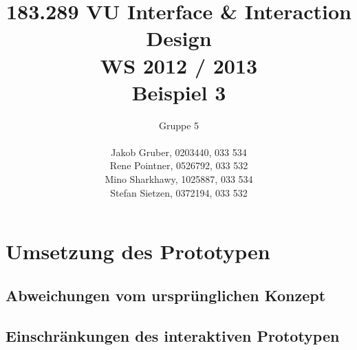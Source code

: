 \documentclass[a4paper,10pt]{article}
\title{
    183.289 VU Interface \& Interaction Design \\
    WS 2012 / 2013 \\
    Beispiel 3}
\author{
    Gruppe 5 \\ \\
    Jakob Gruber, 0203440, 033 534 \\
    Rene Pointner, 0526792, 033 532\\
    Mino Sharkhawy, 1025887, 033 534 \\
    Stefan Sietzen, 0372194, 033 532}
\begin{document}
\maketitle

\clearpage
\tableofcontents

\clearpage
\section{Umsetzung des Prototypen}
\subsection{Abweichungen vom urspr\"unglichen Konzept}

\begin{comment}
Beschreiben Sie kurz die Umsetzung Ihres interaktiven Prototypen. Insbesondere sollen darin folgende Fragen beantwortet werden (jeweils soweit sie auf Ihren Entwicklungsprozess anwendbar sind):

Welche Änderungen waren bei der Umsetzung des interaktiven Prototypen im Vergleich zu Ihrem ursprünglichen Konzept notwendig und weshalb (technische Einschränkungen, Komplexität, ...)?

Welche Aspekte waren in Ihrem ursprünglichen Konzept unterspezifiziert und mussten bei der Umsetzung konkretisiert werden?

Auf welche Schwächen und Probleme in Ihrem Konzept sind Sie bei der Umsetzung des interaktiven Prototypen aufmerksam geworden?


Illustrieren Sie Abweichungen anhand von Wireframes aus Ihrem ursprünglichen Konzept und stellen Sie sie Screenshots aus dem interaktiven Prototypen gegenüber. Heben Sie ggf. spezifische Details graphisch oder in Form von Anmerkungen hervor.
\end{comment}

\clearpage
\subsection{Einschränkungen des interaktiven Prototypen}

\begin{comment}
Welche Aspekte konnten in Ihrem interaktiven Prototypen nur unvollständig umgesetzt werden (z.B. weil der Umsetzungsaufwand zu hoch wäre)? Beschreiben Sie eventuelle Kompromisslösungen ausreichend genau, dass Ihre geplante und beabsichtigte Funktionsweise für den Leser klar verständlich und nachvollziehbar ist.
\end{comment}
\end{document}
